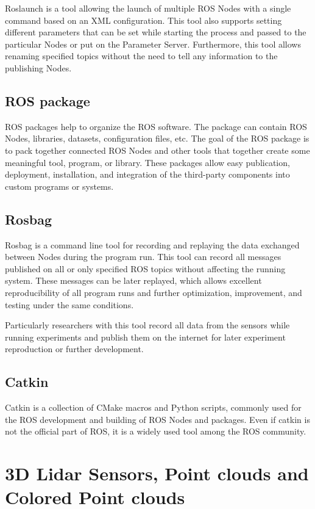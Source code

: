 Roslaunch is a tool allowing the launch of multiple ROS Nodes with a single command based on an XML configuration. This tool also supports setting different parameters that can be set while starting the process and passed to the particular Nodes or put on the Parameter Server. Furthermore, this tool allows renaming specified topics without the need to tell any information to the publishing Nodes.

\subsection*{ROS package}

ROS packages help to organize the ROS software. The package can contain ROS Nodes, libraries, datasets, configuration files, etc. The goal of the ROS package is to pack together connected ROS Nodes and other tools that together create some meaningful tool, program, or library. These packages allow easy publication, deployment, installation, and integration of the third-party components into custom programs or systems.

\subsection*{Rosbag}

Rosbag is a command line tool for recording and replaying the data exchanged between Nodes during the program run. This tool can record all messages published on all or only specified ROS topics without affecting the running system. These messages can be later replayed, which allows excellent reproducibility of all program runs and further optimization, improvement, and testing under the same conditions.\par
Particularly researchers with this tool record all data from the sensors while running experiments and publish them on the internet for later experiment reproduction or further development.

\subsection*{Catkin}

Catkin is a collection of CMake macros and Python scripts, commonly used for the ROS development and building of ROS Nodes and packages. Even if catkin is not the official part of ROS, it is a widely used tool among the ROS community.

\section{3D Lidar Sensors, Point clouds and Colored Point clouds}

